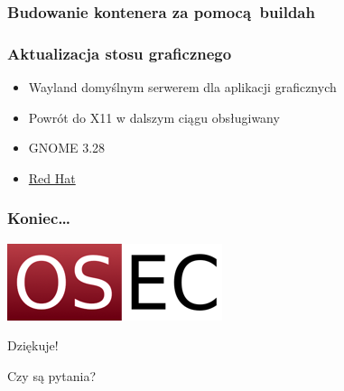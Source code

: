 \documentclass[dvipsnames,table]{beamer}
\begin{document}
\begin{frame}[fragile]
	\frametitle{Budowanie kontenera za pomocą buildah}

\end{frame}

\begin{frame}[fragile]
	\frametitle{Aktualizacja stosu graficznego}
\begin{itemize}
	\item{Wayland domyślnym serwerem dla aplikacji graficznych}
	\item{Powrót do X11 w dalszym ciągu obsługiwany}
	\item{GNOME 3.28}
	\item \href{http://www.redhat.com}{Red Hat}
\end{itemize}
\end{frame}

\begin{frame}
\frametitle{Koniec\ldots}
\begin{center}
\includegraphics[scale=0.5]{img-oseclogo.png}

Dziękuje!

Czy są pytania?

\end{center}
\end{frame}
\end{document}
